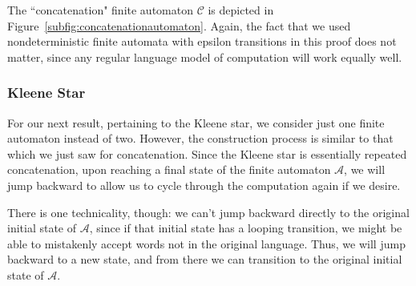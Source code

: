 The ``concatenation" finite automaton $\mathcal{C}$ is depicted in Figure~\ref{subfig:concatenationautomaton}. Again, the fact that we used nondeterministic finite automata with epsilon transitions in this proof does not matter, since any regular language model of computation will work equally well.

\subsubsection*{Kleene Star}

For our next result, pertaining to the Kleene star, we consider just one finite automaton instead of two. However, the construction process is similar to that which we just saw for concatenation. Since the Kleene star is essentially repeated concatenation, upon reaching a final state of the finite automaton $\mathcal{A}$, we will jump backward to allow us to cycle through the computation again if we desire.

There is one technicality, though: we can't jump backward directly to the original initial state of $\mathcal{A}$, since if that initial state has a looping transition, we might be able to mistakenly accept words not in the original language. Thus, we will jump backward to a new state, and from there we can transition to the original initial state of $\mathcal{A}$.

